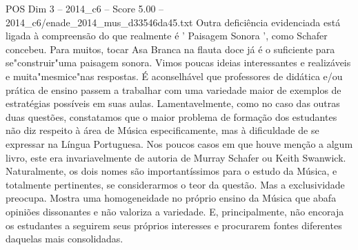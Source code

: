 \begin{textsample}{POS Dim 3 – 2014\_c6 – Score 5.00 – 2014\_c6/enade\_2014\_mus\_d33546da45.txt}
Outra deficiência evidenciada está ligada à compreensão do que realmente é ' Paisagem Sonora ', como Schafer concebeu.
Para muitos, tocar Asa Branca na flauta doce já é o suficiente para se"construir"uma paisagem sonora.
Vimos poucas ideias interessantes e realizáveis e muita"mesmice"nas respostas.
É aconselhável que professores de didática e/ou prática de ensino passem a trabalhar com uma variedade maior de exemplos de estratégias possíveis em suas aulas.
Lamentavelmente, como no caso das outras duas questões, constatamos que o maior problema de formação dos estudantes não diz respeito à área de Música especificamente, mas à dificuldade de se expressar na Língua Portuguesa.
Nos poucos casos em que houve menção a algum livro, este era invariavelmente de autoria de Murray Schafer ou Keith Swanwick.
Naturalmente, os dois nomes são importantíssimos para o estudo da Música, e totalmente pertinentes, se considerarmos o teor da questão.
Mas a exclusividade preocupa.
Mostra uma homogeneidade no próprio ensino da Música que abafa opiniões dissonantes e não valoriza a variedade.
E, principalmente, não encoraja os estudantes a seguirem seus próprios interesses e procurarem fontes diferentes daquelas mais consolidadas.

\end{textsample}
